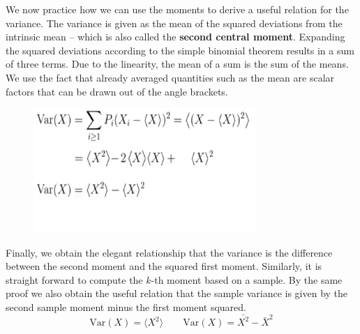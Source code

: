 \documentclass[12pt, a4paper]{scrartcl}
\begin{document}
We now practice how we can use the moments to derive a useful relation for the variance.
The variance is given as the mean of the squared deviations from the intrinsic mean – which is also called the \textbf{second central moment}.
Expanding the squared deviations according to the simple binomial theorem results in a sum of three terms.  Due to the linearity, the mean of a sum is the sum of the means. 
We use the fact that already averaged quantities such as the mean are scalar factors that can be drawn out of the angle brackets.
\begin{figure}[H]
	\centering
	\includegraphics[width=0.75\textwidth]{2_9.png}
\end{figure}
Finally, we obtain the elegant relationship that the variance is the difference between the second moment and the squared first moment.
Similarly, it is straight forward to compute the $k$-th moment based on a sample.
By the same proof we also obtain the useful relation that the sample variance is given by the second sample moment minus the first moment squared.\\

\begin{equation*}\boxed{\text{Var}(X) = \langle X^2 \rangle \qquad \text{Var}(X) = \bar{X^2} - \bar{X}^2}\end{equation*}

\\
\end{document}

